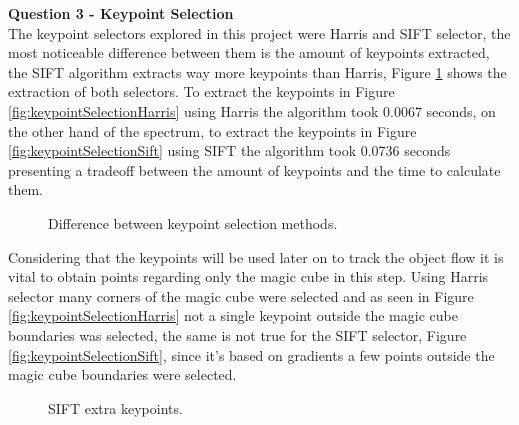 \documentclass[12pt,a4paper]{article}
\begin{document}
\textbf{\LARGE Question 3 - Keypoint Selection} \\

	The keypoint selectors explored in this project were Harris and SIFT selector, the most noticeable difference between them is the amount of keypoints extracted, the SIFT algorithm extracts way more keypoints than Harris, Figure \ref{fig:keypointSelection} shows the extraction of both selectors. To extract the keypoints in Figure \ref{fig:keypointSelectionHarris} using Harris the algorithm took 0.0067 seconds, on the other hand of the spectrum, to extract the keypoints in Figure \ref{fig:keypointSelectionSift} using SIFT the algorithm took 0.0736 seconds presenting a tradeoff between the amount of keypoints and the time to calculate them.\\

\begin{figure}[!h]
	\centering
	\quad
	\caption{Difference between keypoint selection methods.}
	\label{fig:keypointSelection}
\end{figure}

	Considering that the keypoints will be used later on to track the object flow it is vital to obtain points regarding only the magic cube in this step. Using Harris selector many corners of the magic cube were selected and as seen in Figure \ref{fig:keypointSelectionHarris} not a single keypoint outside the magic cube boundaries was selected, the same is not true for the SIFT selector, Figure \ref{fig:keypointSelectionSift}, since it's based on gradients a few points outside the magic cube boundaries were selected.
	
\begin{figure}[!h]
	\centering
	{
		\setlength{\fboxsep}{1pt}
		\setlength{\fboxrule}{1pt}
	}
	\caption{SIFT extra keypoints.}
	\label{fig:keypointSelectionSiftPoints}
\end{figure}
\end{document}
